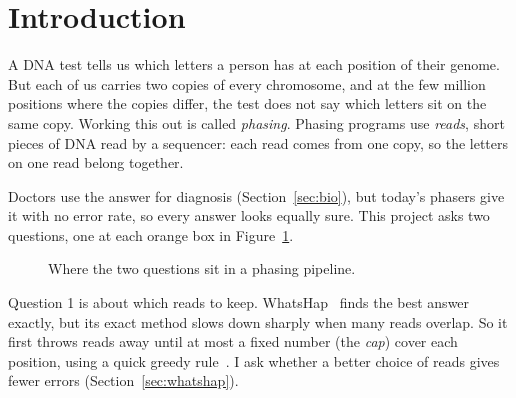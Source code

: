\documentclass[11pt]{article}
\begin{document}
\section{Introduction}\label{sec:intro}

A DNA test tells us which letters a person has at each position of their
genome. But each of us carries two copies of every chromosome, and at the few
million positions where the copies differ, the test does not say which
letters sit on the same copy. Working this out is called \emph{phasing}.
Phasing programs use \emph{reads}, short pieces of DNA read by a sequencer:
each read comes from one copy, so the letters on one read belong together.

Doctors use the answer for diagnosis (Section~\ref{sec:bio}), but today's
phasers give it with no error rate, so every answer looks equally sure. This
project asks two questions, one at each orange box in
Figure~\ref{fig:pipeline}.

\begin{figure}[h]
\centering
{}
\caption{Where the two questions sit in a phasing pipeline.}
\label{fig:pipeline}
\end{figure}

Question 1 is about which reads to keep.
WhatsHap~\cite{patterson2015,martin2016} finds the best answer exactly, but
its exact method slows down sharply when many reads overlap. So it first
throws reads away until at most a fixed number (the \emph{cap}) cover each
position, using a quick greedy rule~\cite{fischer2016}. I ask whether a
better choice of reads gives fewer errors (Section~\ref{sec:whatshap}).
\end{document}
